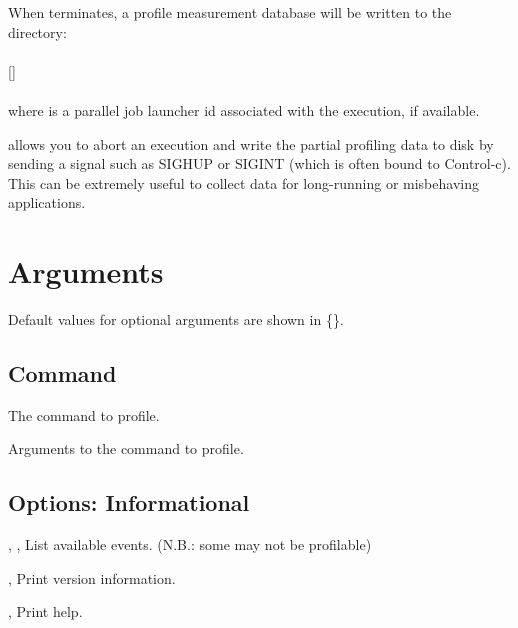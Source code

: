 \documentclass[english]{article}
\begin{document}
When  terminates, a profile measurement database will be written to the directory:\\
\\
\SP\SP\SP {}[\Prog{-}]\\
\\
where  is a parallel job launcher id associated with the execution, if available.

 allows you to abort an execution and write the partial profiling data to disk by sending a signal such as SIGHUP or SIGINT 
(which is often bound to Control-c).
This can be extremely useful to collect data for long-running or misbehaving applications.


\section{Arguments}


Default values for optional arguments are shown in \{\}.

\subsection{Command}

\begin{Description}
\item[\Arg{command}] The command to profile.

\item[\Arg{command-arguments}] Arguments to the command to profile.
\end{Description}

\subsection{Options: Informational}

\begin{Description}
\item[\Opt{-l}, \Opt{-L}, \Opt{--list-events}]
List available events. (N.B.: some may not be profilable)

\item[\Opt{-V}, \Opt{--version}]
Print version information.

\item[\Opt{-h}, \Opt{--help}]
Print help.
\end{Description}
\end{document}
